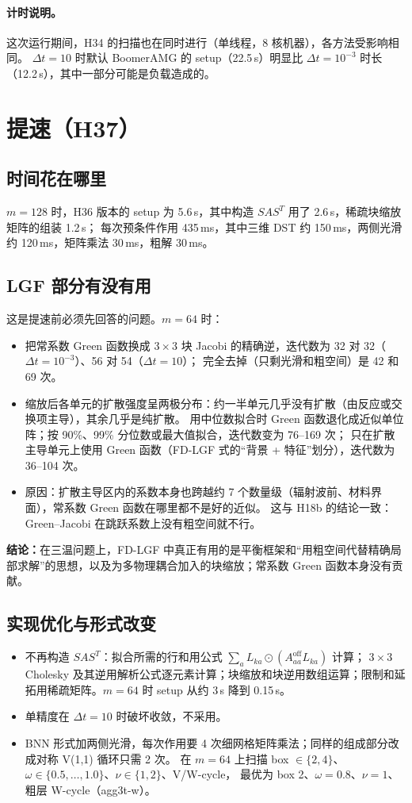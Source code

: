 \documentclass[11pt,a4paper]{ctexart}
\begin{document}
\paragraph{计时说明。}这次运行期间，H34 的扫描也在同时进行（单线程，8 核机器），各方法受影响相同。
$\Delta t=10$ 时默认 BoomerAMG 的 setup（22.5\,s）明显比 $\Delta t=10^{-3}$ 时长（12.2\,s），其中一部分可能是负载造成的。

\section{提速（H37）}
\subsection{时间花在哪里}
$m=128$ 时，H36 版本的 setup 为 5.6\,s，其中构造 $SAS^{T}$ 用了 2.6\,s，稀疏块缩放矩阵的组装 1.2\,s；
每次预条件作用 435\,ms，其中三维 DST 约 150\,ms，两侧光滑约 120\,ms，矩阵乘法 30\,ms，粗解 30\,ms。

\subsection{LGF 部分有没有用}
这是提速前必须先回答的问题。$m=64$ 时：
\begin{itemize}
\item 把常系数 Green 函数换成 $3\times3$ 块 Jacobi 的精确逆，迭代数为 32 对 32（$\Delta t=10^{-3}$）、56 对 54（$\Delta t=10$）；
完全去掉（只剩光滑和粗空间）是 42 和 69 次。
\item 缩放后各单元的扩散强度呈两极分布：约一半单元几乎没有扩散（由反应或交换项主导），其余几乎是纯扩散。
用中位数拟合时 Green 函数退化成近似单位阵；按 90\%、99\% 分位数或最大值拟合，迭代数变为 76--169 次；
只在扩散主导单元上使用 Green 函数（FD-LGF 式的“背景 + 特征”划分），迭代数为 36--104 次。
\item 原因：扩散主导区内的系数本身也跨越约 7 个数量级（辐射波前、材料界面），常系数 Green 函数在哪里都不是好的近似。
这与 H18b 的结论一致：Green--Jacobi 在跳跃系数上没有粗空间就不行。
\end{itemize}
\textbf{结论：}在三温问题上，FD-LGF 中真正有用的是平衡框架和“用粗空间代替精确局部求解”的思想，以及为多物理耦合加入的块缩放；常系数 Green 函数本身没有贡献。

\subsection{实现优化与形式改变}
\begin{itemize}
\item 不再构造 $SAS^{T}$：拟合所需的行和用公式 $\sum_a L_{ka}\odot(A^{\mathrm{off}}_{aa}L_{ka})$ 计算；
$3\times3$ Cholesky 及其逆用解析公式逐元素计算；块缩放和块逆用数组运算；限制和延拓用稀疏矩阵。$m=64$ 时 setup 从约 3\,s 降到 0.15\,s。
\item 单精度在 $\Delta t=10$ 时破坏收敛，不采用。
\item BNN 形式加两侧光滑，每次作用要 4 次细网格矩阵乘法；同样的组成部分改成对称 V(1,1) 循环只需 2 次。
在 $m=64$ 上扫描 box $\in\{2,4\}$、$\omega\in\{0.5,\dots,1.0\}$、$\nu\in\{1,2\}$、V/W-cycle，
最优为 box 2、$\omega=0.8$、$\nu=1$、粗层 W-cycle（agg3t-w）。
\end{itemize}
\end{document}
